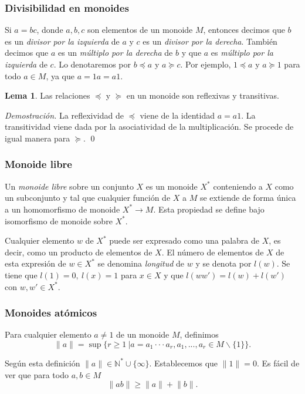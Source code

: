 \documentclass[12pt]{article}
\theoremstyle{definition}
\newtheorem{lema}{Lema}[section]
\providecommand{\norm}[1]{\lVert#1\rVert}
\begin{document}
\subsubsection{Divisibilidad en monoides}

Si $a=bc$, donde $a,b,c$ son elementos de un monoide $M$, entonces decimos que $b$ es un \textit{divisor por la izquierda} de $a$ y $c$ es un \textit{divisor por la derecha}. También decimos que $a$ es un \textit{múltiplo por la derecha} de $b$ y que $a$ es \textit{múltiplo por la izquierda} de $c$. Lo denotaremos por $b\preceq a$ y $a\succeq c$. Por ejemplo, $1\preceq a$ y $a\succeq 1$ para todo $a\in M$, ya que $a=1a=a1$.

\begin{lema}
Las relaciones $\preceq$ y $\succeq$ en un monoide son reflexivas y transitivas.
\label{lema:rel1}
\end{lema}

\textit{Demostración.} La reflexividad de $\preceq$ viene de la identidad $a=a1$. La transitividad viene dada por la asociatividad de la multiplicación. Se procede de igual manera para $\succeq$. \qed

\subsubsection{Monoide libre}
Un \textit{monoide libre} sobre un conjunto $X$ es un monoide $X^*$ conteniendo a $X$ como un subconjunto y tal que cualquier función de $X$ a $M$ se extiende de forma única a un homomorfismo de monoide $X^*\rightarrow M$. Esta propiedad se define bajo isomorfismo de monoide sobre $X^*$.


Cualquier elemento $w$ de $X^*$ puede ser expresado como una palabra de $X$, es decir, como un producto de elementos de $X$. El número de elementos de $X$ de esta expresión de $w\in X^*$ se denomina \textit{longitud} de $w$ y se denota por $l(w)$. Se tiene que $l(1)=0,\ l(x)=1$ para $x\in X$ y que $l(ww')=l(w)+l(w')$ con $w,w'\in X^*$.
\label{monoide_libre}
\subsubsection{Monoides atómicos}

Para cualquier elemento $a\neq 1$ de un monoide $M$, definimos
$$\norm{a}=\sup\{r\geq 1\ | a=a_1\cdot\cdot\cdot a_r,a_1,...,a_r\in M\backslash \{1\}\}.$$

Según esta definición $\norm{a}\in \mathbb{N}^*\cup\{\infty\}$. Establecemos que $\norm{1}=0$. Es fácil de ver que para todo $a,b\in M$
$$\norm{ab}\geq\norm{a}+\norm{b}.$$
\end{document}
